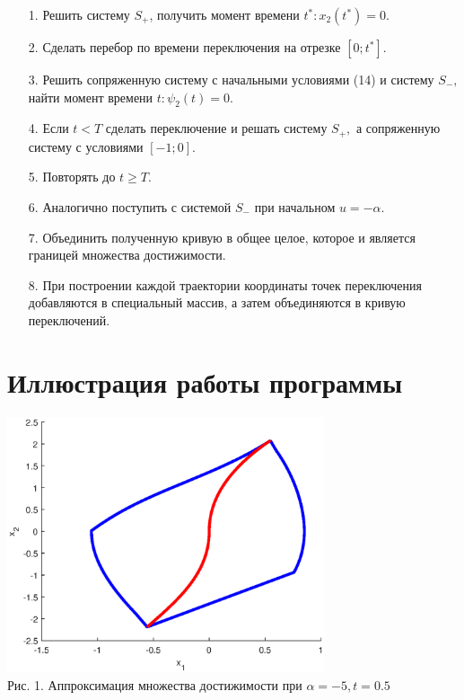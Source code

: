 \documentclass{article}
\theoremstyle{definition}
\begin{document}
 	\begin{itemize}
 		\item [1.]{Решить систему $S_+$, получить момент времени $t^*: x_2(t^*) = 0.$}
 		\item [2.]{Сделать перебор по времени переключения на отрезке $[0;t^*]$.}
 		\item [3.]{Решить сопряженную систему с начальными условиями (14) и систему $S_-,$ найти момент времени $t:\psi_2(t) = 0.$}
 		\item [4.]{Если $t < T$ сделать переключение и решать систему $S_+,$ а сопряженную систему с условиями $[-1;0].$}
 		\item [5.]{Повторять до $t \geq T.$}
 		\item [6.]{Аналогично поступить с системой $S_-$ при начальном $u = -\alpha.$}
 		\item [7.]{Объединить полученную кривую в общее целое, которое и является границей множества достижимости. }
 		\item [8.]{При построении каждой траектории координаты точек переключения добавляются в специальный массив, а затем объединяются в кривую переключений.}
 	\end{itemize}
 	
 	\newpage
 	{\section{Иллюстрация работы программы}}
 	\begin{center}
 		\includegraphics[width=0.7\textwidth]{example1.eps}\\
 		{Рис. 1. Аппроксимация множества достижимости при $\alpha = -5, t = 0.5$ }
 	\end{center}
 
\end{document}
